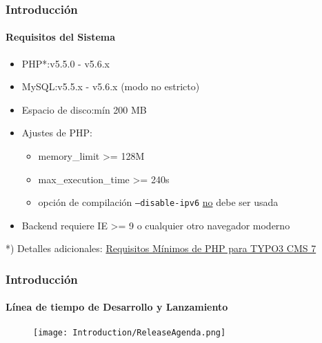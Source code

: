 \begin{frame}[fragile]
	\frametitle{Introducción}
	\framesubtitle{Requisitos del Sistema}

	\begin{itemize}
		\item PHP*:\tabto{2.2cm}v5.5.0 - v5.6.x
		\item MySQL:\tabto{2.2cm}v5.5.x - v5.6.x (modo no estricto)
		\item Espacio de disco:\tabto{3.4cm}mín 200 MB
		\item Ajustes de PHP:

			\begin{itemize}
				\item memory\_limit >= 128M
				\item max\_execution\_time >= 240s
				\item opción de compilación \texttt{--disable-ipv6} \underline{no} debe ser usada
			\end{itemize}

		\item Backend requiere IE >= 9 o cualquier otro navegador moderno

	\end{itemize}

	\vspace{1cm}

	*) Detalles adicionales: \href{http://typo3.org/news/article/php-minimum-requirements-for-typo3-cms-7/}{Requisitos Mínimos de PHP para TYPO3 CMS 7}

\end{frame}

\begin{frame}[fragile]
	\frametitle{Introducción}
	\framesubtitle{Línea de tiempo de Desarrollo y Lanzamiento}

	\begin{figure}
		\texttt{[image: Introduction/ReleaseAgenda.png]}
	\end{figure}

\end{frame}

